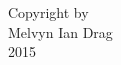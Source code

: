 \thispagestyle{empty}
\vspace*{60pt}
\begin{center}
Copyright by\\
Melvyn Ian Drag\\
2015
\end{center}
\vspace*{\fill}
